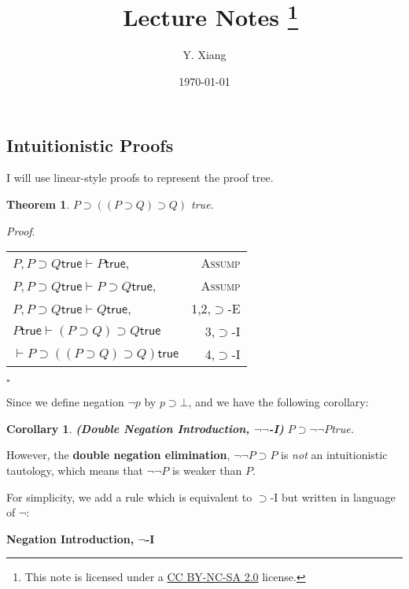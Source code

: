\documentclass{article}
\title{\vspace{-3em}\course\, Lecture Notes \asnum\footnote{This note is licensed under a \href{https://creativecommons.org/licenses/by-nc-sa/2.0/}{CC BY-NC-SA 2.0} license.}}
\author{Y. Xiang\vspace{1em}}
\date{\today\vspace{-1em}}
\newcounter{rowcount}
\newtheorem{theorem}{Theorem}[section]
\newtheorem{corollary}{Corollary}[theorem]
\newenvironment{proof}{\emph{Proof}.}{\hfill$\square$}
\newcommand{\true}{\textsf{true}}
\begin{document}
\maketitle
\subsection{Intuitionistic Proofs}
I will use linear-style proofs to represent the proof tree.
\begin{theorem}
    $P \supset ((P\supset Q)\supset Q)$ \true.
\end{theorem}
\begin{proof}
    \begin{tabular}{@{\stepcounter{rowcount}\therowcount. }lr}
        $P,P\supset Q \true \vdash P\true$,                           & \textsc{Assump} \\
        $P,P\supset Q \true \vdash P\supset Q\true$,                  & \textsc{Assump} \\
        $P,P\supset Q \true \vdash Q \true$,                          & 1,2,$\supset$-E \\
        $P\true \vdash (P\supset Q) \supset Q \true$                  & 3,$\supset$-I   \\
        $\vdash P \supset \left( (P\supset Q) \supset Q \right)\true$ & 4,$\supset$-I   \\
    \end{tabular}
\end{proof}

Since we define negation $\neg p$ by $p \supset \bot$, and we have the following corollary:
\begin{corollary}
    \textbf{(Double Negation Introduction, $\neg \neg$-I)}
    $P\supset \neg \neg P$\true.
\end{corollary}

However, the \textbf{double negation elimination}, $\neg \neg P \supset P$ is \emph{not} an intuitionistic tautology,
which means that $\neg \neg P$ is weaker than $P$.

For simplicity, we add a rule which is equivalent to $\supset$-I but written in language of $\neg$:

\noindent \textbf{Negation Introduction, $\neg$-I}
\begin{mathpar}
\end{mathpar}
\end{document}
